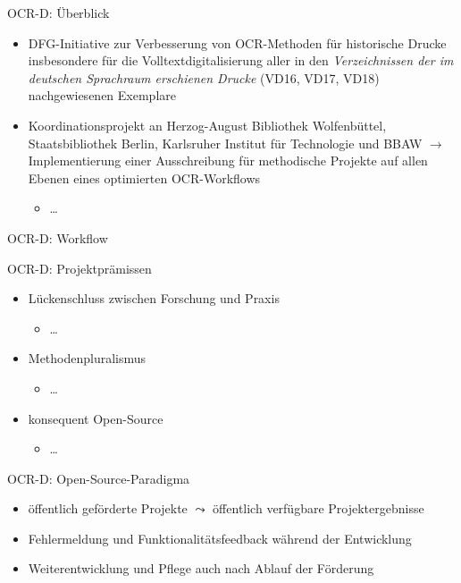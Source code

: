 \documentclass{bbawslides}
\begin{document}
\begin{bbawslide}{OCR-D: Überblick}
  \vspace*{7mm}%
  \centerslidestrue%
  \begin{itemize}
    \item DFG-Initiative zur Verbesserung von OCR-Methoden für historische Drucke insbesondere
          für die Volltextdigitalisierung aller in den \emph{Verzeichnissen der im deutschen
          Sprachraum erschienen Drucke} (VD16, VD17, VD18) nachgewiesenen Exemplare
    \item Koordinationsprojekt an Herzog-August Bibliothek Wolfenbüttel, Staatsbibliothek
          Berlin, Karlsruher Institut für Technologie und BBAW $\rightarrow$ Implementierung
          einer Ausschreibung für methodische
          Projekte auf allen Ebenen eines optimierten OCR-Workflows
    \begin{itemize}\small
      \item \ldots
    \end{itemize}
  \end{itemize}
\end{bbawslide}

\begin{bbawslide}{OCR-D: Workflow}
\end{bbawslide}

\begin{bbawslide}{OCR-D: Projektprämissen}
  \vspace*{7mm}%
  \centerslidestrue%
  \begin{itemize}
    \item Lückenschluss zwischen Forschung und Praxis
    \begin{itemize}\small
      \item \ldots
    \end{itemize}
    \item Methodenpluralismus
    \begin{itemize}\small
      \item \ldots
    \end{itemize}
    \item konsequent Open-Source
    \begin{itemize}\small
      \item \ldots
    \end{itemize}
  \end{itemize}
\end{bbawslide}

\begin{bbawslide}{OCR-D: Open-Source-Paradigma}
  \vspace*{7mm}%
  \centerslidestrue%
  \begin{itemize}
    \item öffentlich geförderte Projekte $\leadsto$ öffentlich verfügbare Projektergebnisse
    \item Fehlermeldung und Funktionalitätsfeedback während der Entwicklung
    \item Weiterentwicklung und Pflege auch nach Ablauf der Förderung
  \end{itemize}
\end{bbawslide}
\end{document}
